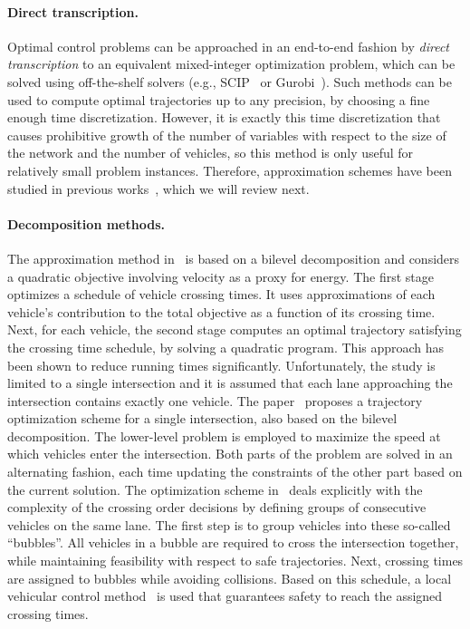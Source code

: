 \documentclass[a4paper]{report}
\theoremstyle{definition}
\theoremstyle{plain}
\begin{document}
\paragraph{Direct transcription.}
Optimal control problems can be approached in an end-to-end fashion by
\textit{direct transcription} to an equivalent mixed-integer optimization
problem, which can be solved using off-the-shelf solvers (e.g.,
SCIP~\cite{BolusaniEtal2024OO} or Gurobi~\cite{gurobi}). Such methods can be
used to compute optimal trajectories up to any precision, by choosing a fine
enough time discretization. However, it is exactly this time discretization that
causes prohibitive growth of the number of variables with respect to the size of
the network and the number of vehicles, so this method is only useful for
relatively small problem instances.
%
Therefore, approximation schemes have been studied in previous
works~\cite{hultApproximateSolutionOptimal2015,zhaoBilevelProgrammingModel2021,tallapragadaHierarchicaldistributedOptimizedCoordination2017},
which we will review next.

\paragraph{Decomposition methods.}
The approximation method in~\cite{hultApproximateSolutionOptimal2015} is based
on a bilevel decomposition and considers a quadratic objective involving
velocity as a proxy for energy. The first stage optimizes a schedule of vehicle
crossing times. It uses approximations of each vehicle's contribution to the
total objective as a function of its crossing time. Next, for each vehicle, the
second stage computes an optimal trajectory satisfying the crossing time
schedule, by solving a quadratic program. This approach has been shown to reduce
running times significantly. Unfortunately, the study is limited to a single
intersection and it is assumed that each lane approaching the intersection
contains exactly one vehicle.
The paper~\cite{zhaoBilevelProgrammingModel2021} proposes a trajectory
optimization scheme for a single intersection, also based on the bilevel
decomposition. The lower-level problem is employed to maximize the speed at
which vehicles enter the intersection. Both parts of the problem are solved in an alternating
fashion, each time updating the constraints of the other part based on the
current solution.
The optimization scheme
in~\cite{tallapragadaHierarchicaldistributedOptimizedCoordination2017} deals
explicitly with the complexity of the crossing order decisions by defining
groups of consecutive vehicles on the same lane. The first step is to group
vehicles into these so-called ``bubbles''. All vehicles in a bubble are required
to cross the intersection together, while maintaining feasibility with respect
to safe trajectories. Next, crossing times are assigned to bubbles while
avoiding collisions. Based on this schedule, a local vehicular control
method~\cite{tallapragadaDistributedControlVehicle2017} is used that guarantees
safety to reach the assigned crossing times.
\end{document}
